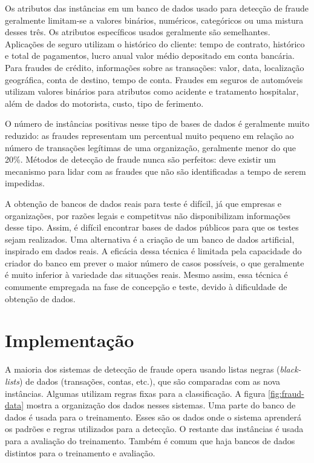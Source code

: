 Os atributos das instâncias em um banco de dados usado para detecção de fraude geralmente limitam-se a valores binários, numéricos, categóricos ou uma mistura desses três. Os atributos específicos usados geralmente são semelhantes. Aplicações de seguro utilizam o histórico do cliente: tempo de contrato, histórico e total de pagamentos, lucro anual valor médio depositado em conta bancária. Para fraudes de crédito, informações sobre as transações: valor, data, localização geográfica, conta de destino, tempo de conta. Fraudes em seguros de automóveis utilizam valores binários para atributos como acidente e tratamento hospitalar, além de dados do motorista, custo, tipo de ferimento.

O número de instâncias positivas nesse tipo de bases de dados é geralmente muito reduzido: as fraudes representam um percentual muito pequeno em relação ao número de transações legítimas de uma organização, geralmente menor do que 20\%. Métodos de detecção de fraude nunca são perfeitos: deve existir um mecanismo para lidar com as fraudes que não são identificadas a tempo de serem impedidas.

A obtenção de bancos de dados reais para teste é difícil, já que empresas e organizações, por razões legais e competitvas não disponibilizam informações desse tipo. Assim, é difícil encontrar bases de dados públicos para que os testes sejam realizados. Uma alternativa é a criação de um banco de dados artificial, inspirado em dados reais. A eficácia dessa técnica é limitada pela capacidade do criador do banco em prever o maior número de casos possíveis, o que geralmente é muito inferior à variedade das situações reais. Mesmo assim, essa técnica é comumente empregada na fase de concepção e teste, devido à dificuldade de obtenção de dados.

\section{Implementação}

A maioria dos sistemas de detecção de fraude opera usando listas negras (\emph{black-lists}) de dados (transações, contas, etc.), que são comparadas com as nova instâncias. Algumas utilizam regras fixas para a classificação. A figura \ref{fig:fraud-data} mostra a organização dos dados nesses sistemas. Uma parte do banco de dados é usada para o treinamento. Esses são os dados onde o sistema aprenderá os padrões e regras utilizados para a detecção. O restante das instâncias é usada para a avaliação do treinamento. Também é comum que haja bancos de dados distintos para o treinamento e avaliação.

